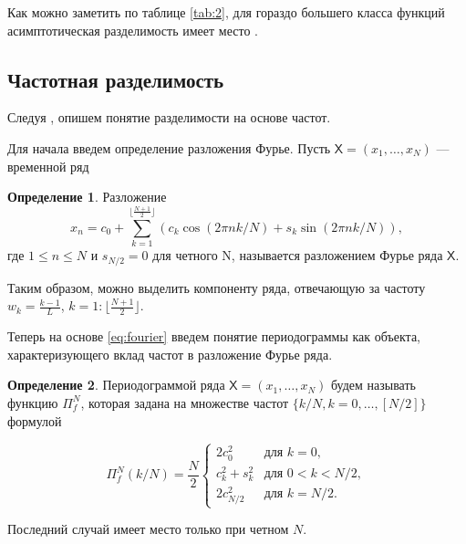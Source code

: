 \documentclass[12pt, specialist, subf
]{disser}
\theoremstyle{definition}
\newcommand{\TS}{\mathsf{X}}
\newtheorem{definition}{Определение} %
\begin{document}
Как можно заметить по таблице \ref{tab:2}, для гораздо большего класса функций асимптотическая разделимость имеет место \cite{golyandina2001analysis}.
\begin{table}[H]
	\begin{center}
		\caption{Асимптотическая разделимость.}
		\label{tab:2}
	\end{center}
\end{table}


\subsection{Частотная разделимость}
\label{subsec:freq_razd}

Следуя \cite[Глава~1, Раздел~1.4]{golyandina2001analysis}, опишем понятие разделимости на основе частот.

Для начала введем определение разложения Фурье.
Пусть $\TS = (x_1, \dots, x_N)$ — временной ряд
\begin{definition}
	Разложение
	\begin{equation}
		\label{eq:fourier}
		x_n = c_0 + \sum\limits_{k = 1}^{\lfloor \frac{N+1}{2} \rfloor}\left(c_k \cos(2\pi n k / N) + s_k \sin(2\pi n k / N) \right),
	\end{equation}
	где $1 \leq n \leq N$ и $s_{N/2} = 0 $ для четного N, называется разложением Фурье ряда $\TS$.
\end{definition}

Таким образом, можно выделить компоненту ряда, отвечающую за частоту $w_k = \frac{k-1}{L}$, $k = 1:\lfloor \frac{N+1}{2} \rfloor$.


Теперь на основе \eqref{eq:fourier} введем понятие периодограммы   как объекта, характеризующего вклад частот в разложение Фурье ряда.

\begin{definition}
	Периодограммой ряда $\TS = (x_1, \dots, x_N)$
	будем называть функцию \(\Pi_f^N\), которая задана на множестве частот
	\(\{k/N, k = 0, \ldots, [N/2]\}\) формулой

	\[
		\Pi_f^N(k/N) = \frac{N}{2}
		\begin{cases}
			2c_0^2        & \text{для } k = 0,       \\
			c_k^2 + s_k^2 & \text{для } 0 < k < N/2, \\
			2c_{N/2}^2    & \text{для } k = N/2.
		\end{cases}
	\]

	Последний случай имеет место только при четном \(N\).
\end{definition}
\end{document}
